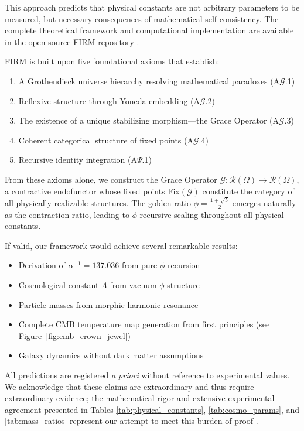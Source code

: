 \documentclass[12pt]{article}
\newcommand{\G}{\mathcal{G}}                %
\newcommand{\R}{\mathcal{R}}                %
\newcommand{\IdentityOp}{\Psi}              %
\newcommand{\Fix}{\text{Fix}}               %
\begin{document}
This approach predicts that physical constants are not arbitrary parameters to be measured, but necessary consequences of mathematical self-consistency. The complete theoretical framework and computational implementation are available in the open-source FIRM repository \cite{FIRM2024}.

FIRM is built upon five foundational axioms that establish:
\begin{enumerate}
    \item A Grothendieck universe hierarchy resolving mathematical paradoxes (A$\mathcal{G}$.1)
    \item Reflexive structure through Yoneda embedding (A$\mathcal{G}$.2)  
    \item The existence of a unique stabilizing morphism---the Grace Operator (A$\mathcal{G}$.3)
    \item Coherent categorical structure of fixed points (A$\mathcal{G}$.4)
    \item Recursive identity integration (A$\IdentityOp$.1)
\end{enumerate}

From these axioms alone, we construct the Grace Operator $\G: \R(\Omega) \to \R(\Omega)$, a contractive endofunctor whose fixed points $\Fix(\G)$ constitute the category of all physically realizable structures. The golden ratio $\phi = \frac{1+\sqrt{5}}{2}$ emerges naturally as the contraction ratio, leading to $\phi$-recursive scaling throughout all physical constants.

If valid, our framework would achieve several remarkable results:
\begin{itemize}
    \item Derivation of $\alpha^{-1} = 137.036$ from pure $\phi$-recursion
    \item Cosmological constant $\Lambda$ from vacuum $\phi$-structure  
    \item Particle masses from morphic harmonic resonance
    \item Complete CMB temperature map generation from first principles (see Figure~\ref{fig:cmb_crown_jewel})
    \item Galaxy dynamics without dark matter assumptions
\end{itemize}

All predictions are registered \emph{a priori} without reference to experimental values. We acknowledge that these claims are extraordinary and thus require extraordinary evidence; the mathematical rigor and extensive experimental agreement presented in Tables \ref{tab:physical_constants}, \ref{tab:cosmo_params}, and \ref{tab:mass_ratios} represent our attempt to meet this burden of proof \citep{Planck2018, DESI2024, PantheonPlus2022}.
\end{document}
